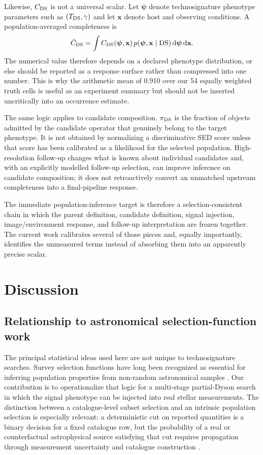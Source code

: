 \documentclass[fleqn,usenatbib]{mnras}
\begin{document}
Likewise, $C_{\rm DS}$ is not a universal scalar. Let $\boldsymbol\psi$ denote technosignature phenotype parameters such as $(T_{\rm DS},\gamma)$ and let $\mathbf{x}$ denote host and observing conditions. A population-averaged completeness is
\begin{equation}
\bar C_{\rm DS}=
\int C_{\rm DS}(\boldsymbol\psi,\mathbf{x})
\,p(\boldsymbol\psi,\mathbf{x}\mid{\rm DS})
\,{\rm d}\boldsymbol\psi\,{\rm d}\mathbf{x}.
\label{eq:marginal_completeness}
\end{equation}
The numerical value therefore depends on a declared phenotype distribution, or else should be reported as a response surface rather than compressed into one number. This is why the arithmetic mean of 0.910 over our 54 equally weighted truth cells is useful as an experiment summary but should not be inserted uncritically into an occurrence estimate.

The same logic applies to candidate composition. $\pi_{\rm DS}$ is the fraction of objects admitted by the candidate operator that genuinely belong to the target phenotype. It is not obtained by normalizing a discriminative SED score unless that score has been calibrated as a likelihood for the selected population. High-resolution follow-up changes what is known about individual candidates and, with an explicitly modelled follow-up selection, can improve inference on candidate composition; it does not retroactively convert an unmatched upstream completeness into a final-pipeline response.

The immediate population-inference target is therefore a selection-consistent chain in which the parent definition, candidate definition, signal injection, image/environment response, and follow-up interpretation are frozen together. The current work calibrates several of those pieces and, equally importantly, identifies the unmeasured terms instead of absorbing them into an apparently precise scalar.

\section{Discussion}

\subsection{Relationship to astronomical selection-function work}

The principal statistical ideas used here are not unique to technosignature searches. Survey selection functions have long been recognized as essential for inferring population properties from non-random astronomical samples \citep{EverallDas2020,BoubertEverall2022}. Our contribution is to operationalize that logic for a multi-stage partial-Dyson search in which the signal phenotype can be injected into real stellar measurements. The distinction between a catalogue-level subset selection and an intrinsic population selection is especially relevant: a deterministic cut on reported quantities is a binary decision for a fixed catalogue row, but the probability of a real or counterfactual astrophysical source satisfying that cut requires propagation through measurement uncertainty and catalogue construction \citep{BoubertEverall2022}.
\end{document}
